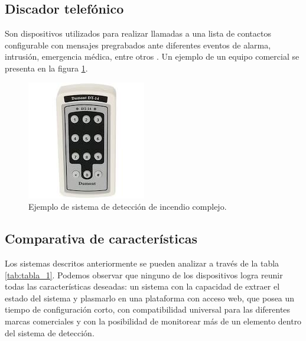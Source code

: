 \subsection{Discador telefónico}

Son dispositivos utilizados para realizar llamadas a una lista de contactos configurable con mensajes pregrabados ante diferentes eventos de alarma, intrusión, emergencia médica, entre otros \cite{discador}. Un ejemplo de un equipo comercial se presenta en la figura  \ref{fig:figura_g1}.  

\begin{figure}[h]
	\centering
	\includegraphics[scale=.4]{./Figures/Capitulo1/FIG_G1.jpeg}
	\caption{Ejemplo de sistema de detección de incendio complejo.}
	\label{fig:figura_g1}
\end{figure}

\subsection{Comparativa de características}

Los sistemas descritos anteriormente se pueden analizar a través de la tabla \ref{tab:tabla_1}. Podemos observar que ninguno de los dispositivos logra reunir todas las características deseadas: un sistema con la capacidad de extraer el estado del sistema y plasmarlo en una plataforma con acceso web, que posea un tiempo de configuración corto, con compatibilidad universal para las diferentes marcas comerciales y con la posibilidad de monitorear más de un elemento dentro del sistema de detección.

